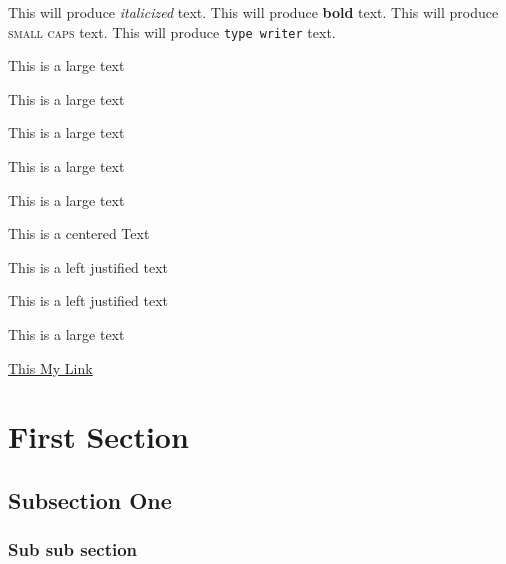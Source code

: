 \documentclass[11pt]{article}
\begin{document}

This will produce \textit{italicized} text.
This will produce \textbf{bold} text.
This will produce \textsc{small caps} text.
This will produce \texttt{type writer} text.
\begin{large}This is a large text\end{large}
\begin{Large}This is a large text\end{Large}
\begin{Huge}This is a large text\end{Huge}
\begin{small}This is a large text\end{small}
\begin{tiny}This is a large text\end{tiny}
\begin{center}This is a centered Text\end{center}
\begin{flushleft}This is a left justified text\end{flushleft}
\begin{flushright}This is a left justified text\end{flushright}

\Large
This is a large text


\href{www.google.com}{This My Link}


\section{First Section}
\subsection{Subsection One}
\subsubsection{Sub sub section}
\end{document}
